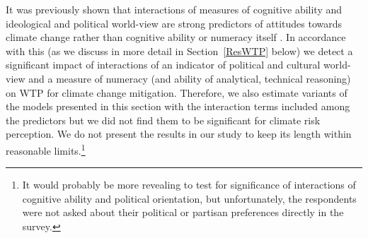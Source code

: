 \documentclass[a4paper,12pt]{article}
\begin{document}
It was previously shown that interactions of measures of cognitive ability and ideological and political world-view are strong predictors of attitudes towards climate change rather than cognitive ability or numeracy itself \citep{Kahan2012, KahanEtAl2012, Hamilton2011, HamiltonKeim2009}. In accordance with this (as we discuss in more detail in Section~\ref{ResWTP} below) we detect a significant impact of interactions of an indicator of political and cultural world-view and a measure of numeracy (and ability of analytical, technical reasoning) on WTP for climate change mitigation. Therefore, we also estimate variants of the models presented in this section with the interaction terms included among the predictors but we did not find them to be significant for climate risk perception. We do not present the results in our study to keep its length within reasonable limits.\footnote{It would probably be more revealing to test for significance of interactions of cognitive ability and political orientation, but unfortunately, the respondents were not asked about their political or partisan preferences directly in the survey.} 















\vspace{1.5cm}
\end{document}
